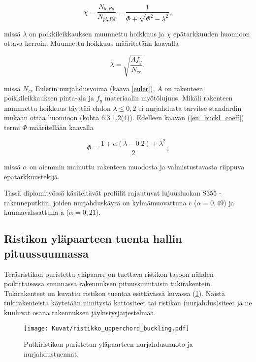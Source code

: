 \documentclass[12pt]{article}
\newenvironment{content}{\pagenumbering{arabic}}{}
\begin{document}
\begin{content}
\begin{equation}
\label{en_buckl_coeff}
\chi = \frac{N_{b,Rd}}{N_{pl,Rd}} =\frac{1}{\Phi + \sqrt{\Phi^2-\lambda^2}},
\end{equation}

missä $\lambda$ on poikkileikkauksen muunnettu hoikkuus ja $\chi$ epätarkkuuden huomioon ottava kerroin. Muunnettu hoikkuus määritetään kaavalla 

\begin{equation}
\label{hoikkuus}
\lambda = \sqrt{\frac{A f_y}{N_{cr}}},
\end{equation}

missä $N_{cr}$ Eulerin nurjahdusvoima (kaava \ref{euler}), $A$ on rakenteen poikkileikkauksen pinta-ala ja $f_y$ materiaalin myötölujuus. Mikäli rakenteen muunnettu hoikkuus täyttää ehdon $\lambda \leq 0,2$ ei nurjahdusta tarvitse standardin mukaan ottaa huomioon (kohta 6.3.1.2(4)). Edelleen kaavan (\ref{en_buckl_coeff}) termi $\Phi$ määritellään kaavalla

\begin{equation}
\label{phi}
\Phi = \frac{1+\alpha (\lambda-0.2)+\lambda^2}{2},
\end{equation}   

missä $\alpha$ on aiemmin mainuttu rakenteen muodosta ja valmistustavasta riippuva epätarkkuustekijä. 

Tässä diplomityössä käsiteltävät profiilit rajautuvat lujuusluokan S355 -rakenneputkiin, joiden nurjahduskäyrä on kylmämuovattuna c ($\alpha = 0,49$) ja kuumavalssattuna a ($\alpha = 0,21$).  



\subsection{Ristikon yläpaarteen tuenta hallin pituussuunnassa}

Teräsristikon puristettu yläpaarre on tuettava ristikon tasoon nähden poikittaisessa suunnassa rakennuksen pituussuuntaisin tukirakentein. Tukirakenteet on kuvattu ristikon tuentaa esittävässä kuvassa (\ref{fig:ristikon_nurjahdus}). Näistä tukirakenteista käytetään nimitystä kattositeet tai ristikon (nurjahdus)siteet ja ne kuuluvat osana rakennuksen jäykistysjärjestelmää.  \parencite{try_kaitila}
 
\begin{figure}[htb]

\texttt{[image: Kuvat/ristikko\_upperchord\_buckling.pdf]}
\caption{Putkiristikon puristetun yläpaarteen nurjahdusmuoto ja nurjahdustuennat.}
\label{fig:ristikon_nurjahdus}
\end{figure}


\end{content}
\end{document}
